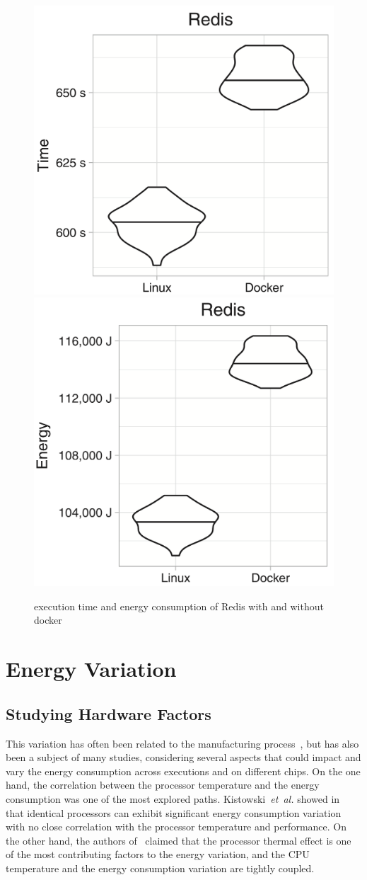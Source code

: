 \begin{figure}
    \includegraphics[width=.5\linewidth]{imgs/docker_vs_vm_energy_paper/reddis_time}
    \includegraphics[width=.5\linewidth]{imgs/docker_vs_vm_energy_paper/reddis_energy}
    \caption{execution time and energy consumption of Redis  with and without docker \cite{santos2018does}}\label{fig:docker_reddis}
\end{figure}


\section{Energy Variation}
\subsection{Studying Hardware Factors}
This variation has often been related to the manufacturing process~\cite{coles_comparing_2014}, but has also been a subject of many studies, considering several aspects that could impact and vary the energy consumption across executions and on different chips.
On the one hand, the correlation between the processor temperature and the energy consumption was one of the most explored paths.
Kistowski~\emph{et~al.} showed in~\cite{joakim_v_kisroski_variations_2016} that identical processors can exhibit significant energy consumption variation with no close correlation with the processor temperature and performance.
On the other hand, the authors of~\cite{wang_potential_2018} claimed that the processor thermal effect is one of the most contributing factors to the energy variation, and the CPU temperature and the energy consumption variation are tightly coupled.

